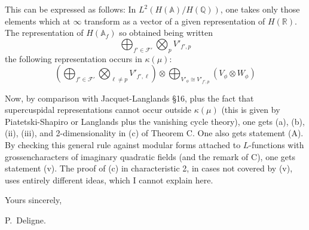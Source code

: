 \documentclass[11pt,a4paper]{article}
\theoremstyle{plain}
\theoremstyle{definition}
\theoremstyle{remark}
\newcommand{\Q}{\mathbb{Q}}
\newcommand{\R}{\mathbb{R}}
\begin{document}
This can be expressed as follows: In $L^{2}(H(\mathbb{A})/H(\Q))$, one takes only those elements which at $\infty$ transform as a vector of a given representation of $H(\R)$. The representation of $H(\mathbb{A}_{f})$ so obtained being written
\[
\bigoplus_{f' \in \mathcal{F}'} \bigotimes_{p} V'_{f',p}
\]
the following representation occurs in $\kappa(\mu)$:
\[
\left(\bigoplus_{f' \in \mathcal{F}'} \bigotimes_{\ell \neq p} V'_{f',\ell}\right) \otimes \bigoplus_{V'_{\phi} \cong V'_{f',p}} (V_{\phi} \otimes W_{\phi})
\]

Now, by comparison with Jacquet-Langlands \S16, plus the fact that supercuspidal representations cannot occur outside $\kappa(\mu)$ (this is given by Piatetski-Shapiro or Langlands plus the vanishing cycle theory), one gets (a), (b), (ii), (iii), and 2-dimensionality in (c) of Theorem C. One also gets statement (A). By checking this general rule against modular forms attached to $L$-functions with grossencharacters of imaginary quadratic fields (and the remark of C), one gets statement (v). The proof of (c) in characteristic 2, in cases not covered by (v), uses entirely different ideas, which I cannot explain here.

\bigskip
\bigskip

\noindent
\hfill Yours sincerely,

\noindent
\hfill P.~Deligne.
\end{document}

